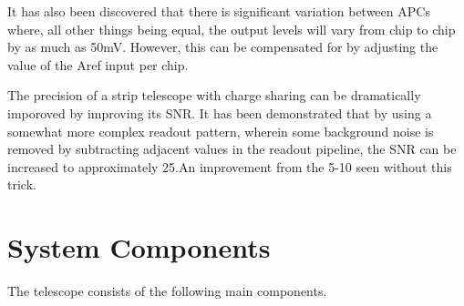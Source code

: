 \documentclass{article}
\begin{document}
It has also been discovered that there is significant variation between APCs where, all other things being equal, the output levels will vary from chip to chip by as much as 50mV.\cite{Ryser2013} However, this can be compensated for by adjusting the value of the Aref input per chip.

The precision of a strip telescope with charge sharing can be dramatically imporoved by improving its \gls{SNR}. It has been demonstrated that by using a somewhat more complex readout pattern, wherein some background noise is removed by subtracting adjacent values in the readout pipeline, the \gls{SNR} can be increased to approximately 25.An improvement from the 5-10 seen without this trick.\cite{Ryser2013}




\section{System Components}
The telescope consists of the following main components.
\end{document}
